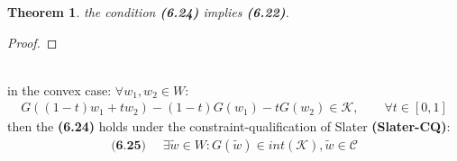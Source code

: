 \documentclass[a4paper,11pt,fleqn]{book}
\newtheorem{theorem}{Theorem}[section]
\theoremstyle{definition}
\theoremstyle{remark}
\begin{document}
\begin{theorem}
	the condition \textbf{(6.24)} implies \textbf{(6.22)}.
\end{theorem}
\begin{proof}
\end{proof}
\quad\\
in the convex case: $\forall w_1, w_2 \in W$:
\begin{align*}
	G((1 - t)w_1 + tw_2) - (1 - t) G(w_1) - tG(w_2) \in \mathcal{K}, \qquad \forall t \in [0, 1]
\end{align*}
then the \textbf{(6.24)} holds under the constraint-qualification of Slater \textbf{(Slater-CQ)}: 
\begin{align*}
\textbf{(6.25) }\quad
	\exists \tilde{w} \in W: G(\tilde{w}) \in int(\mathcal{K}), \tilde{w} \in \mathcal{C}
\end{align*}
\end{document}
